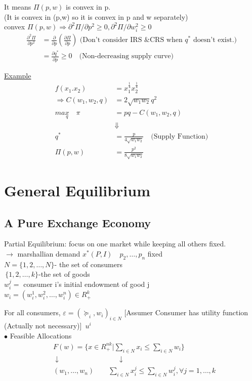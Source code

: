 \documentclass[letterpaper,13pt,single,pdftex]{scrartcl}
\begin{document}
\begin{enumerate}
    It means $\Pi(p,w)$ is convex in p.\\(It is convex in (p,w) so it is convex in p and w separately)\\
    convex $\Pi(p,w) \Rightarrow \partial^2 \Pi/\partial p^2 \ge 0, \partial^2 \Pi/\partial w_i^2 \ge 0$
    \begin{align*}
        \frac{\partial^2 \Pi}{\partial p^2} 
        &= \frac{\partial }{\partial p}(\frac{\partial \Pi}{\partial p})\text{ (Don't consider IRS &CRS when $q^*$ doesn't exist.)} \\
        &=\frac{\partial q^*}{\partial p}\ge 0\quad \text{(Non-decreasing supply curve)}
    \end{align*}
\end{enumerate}
\underline{Example}
\begin{align*}
    f(x_1.x_2) &= x_1^{\frac{1}{4}}x_2^{\frac{1}{4}}\\
    \Rightarrow C(w_1,w_2,q) &= 2\sqrt{w_1w_2}q^2\\
    max\limits_{q} \quad \pi &= pq-C(w_1,w_2,q)\\
    &\Downarrow\\
    q^*&= \frac{p}{4\sqrt{w_1w_2}}\quad \text{(Supply Function)}\\
    \Pi(p,w) &= \frac{p^2}{8\sqrt{w_1w_2}}
\end{align*}
\newpage
\section{General Equilibrium}
\subsection{A Pure Exchange Economy}
Partial Equilibrium: focus on one market while keeping all others fixed. \\$\rightarrow$ marshallian demand $x^*(P,I) \quad p_2,\dots,p_n $ fixed\\

$N = \{1,2,\dots,N\}$- the set of consumers\\
$\,\{1,2,\dots,k\}$-the set of goods\\

$w_i^j=$ consumer i's initial endowment of good j\\
$w_i = (w_i^1,w_i^2,\dots,w_i^n) \in R^k_+$ 

For all consumers, $\varepsilon = (\succeq_i, w_i)_{i\in N}$ [Assumer Consumer has utility function (Actually not necessary)] \qquad \qquad \quad \,$u^i$\\
$\bullet$ Feasible Allocations
\begin{align*}
    &F(w) = \{x \in R_+^{nk}|\sum\limits_{i\in N} x_i \le \sum\limits_{i\in N}w_i\} \\
    &\downarrow \qquad \qquad \qquad \qquad \downarrow\\
    &(w_1,\dots,w_n)\qquad \sum\limits_{i\in N} x_i^j \le \sum\limits_{i\in N}w_i^j,\forall j=1,\dots, k
\end{align*}
\end{document}
